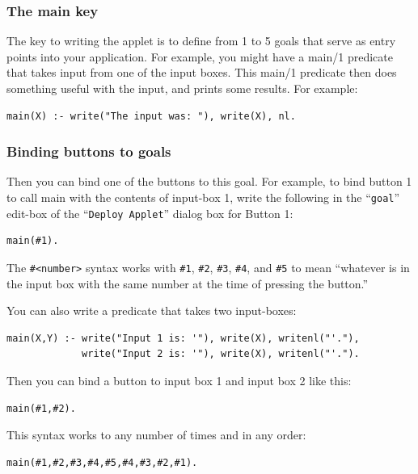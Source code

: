 \documentclass{book}
\begin{document}
\subsubsection{The main key}

The key to writing the applet is to define from 1 to 5 goals that
serve as entry points into your application.  For example, you might
have a main/1 predicate that takes input from one of the input boxes.
This main/1 predicate then does something useful with the input, and
prints some results.  For example:


\begin{verbatim}
main(X) :- write("The input was: "), write(X), nl.
\end{verbatim}


\subsubsection{Binding buttons to goals}

Then you can bind one of the buttons to this goal.  For example, to
bind button 1 to call main with the contents of input-box 1, write the
following in the ``\texttt{goal}'' edit-box of the ``\texttt{Deploy
Applet}'' dialog box for Button 1:


\begin{verbatim}
main(#1).
\end{verbatim}


The \texttt{\#<number>} syntax works with \texttt{\#1}, \texttt{\#2},
\texttt{\#3}, \texttt{\#4}, and \texttt{\#5} to mean ``whatever is in
the input box with the same number at the time of pressing the
button.''

You can also write a predicate that takes two input-boxes:


\begin{verbatim}
main(X,Y) :- write("Input 1 is: '"), write(X), writenl("'."),
             write("Input 2 is: '"), write(X), writenl("'.").
\end{verbatim}


Then you can bind a button to input box 1 and input box 2 like this:


\begin{verbatim}
main(#1,#2).
\end{verbatim}


This syntax works to any number of times and in any order:


\begin{verbatim}
main(#1,#2,#3,#4,#5,#4,#3,#2,#1).
\end{verbatim}
\end{document}
